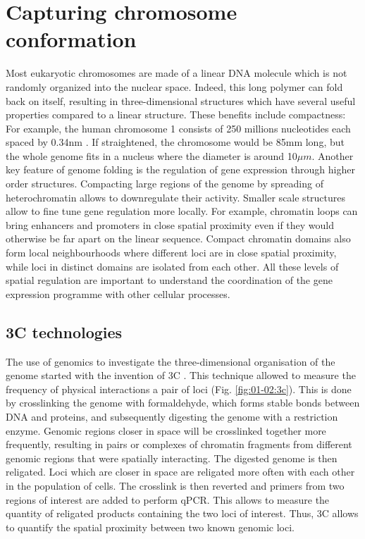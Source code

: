 \section{Capturing chromosome conformation}
Most eukaryotic chromosomes are made of a linear DNA molecule which is not randomly organized into the nuclear space. Indeed, this long polymer can fold back on itself, resulting in three-dimensional structures which have several useful properties compared to a linear structure. These benefits include compactness: For example, the human chromosome 1 consists of 250 millions nucleotides each spaced by 0.34nm \cite {langridgeMolecularConfigurationDeoxyribonucleic1960}. If straightened, the chromosome would be 85mm long, but the whole genome fits in a nucleus where the diameter is around 10$\mu m$. Another key feature of genome folding is the regulation of gene expression through higher order structures. Compacting large regions of the genome by spreading of \Gls{heterochromatin} allows to downregulate their activity. Smaller scale structures allow to fine tune gene regulation more locally. For example, \Gls{chromatin} loops can bring enhancers and promoters in close spatial proximity even if they would otherwise be far apart on the linear sequence. Compact chromatin domains also form local neighbourhoods where different loci are in close spatial proximity, while loci in distinct domains are isolated from each other. All these levels of spatial regulation are important to understand the coordination of the gene expression programme with other cellular processes.

\subsection{3C technologies}

The use of genomics to investigate the three-dimensional organisation of the genome started with the invention of \acrfull{3C} \cite{dekkerCapturingChromosomeConformation2002}. This technique allowed to measure the frequency of physical interactions a pair of loci (Fig. \ref{fig:01-02:3c}). This is done by crosslinking the genome with formaldehyde, which forms stable bonds between DNA and proteins, and subsequently digesting the genome with a restriction enzyme. Genomic regions closer in space will be crosslinked together more frequently, resulting in pairs or complexes of chromatin fragments from different genomic regions that were spatially interacting. The digested genome is then religated. Loci which are closer in space are religated more often with each other in the population of cells. The crosslink is then reverted and primers from two regions of interest are added to perform qPCR. This allows to measure the quantity of religated products containing the two loci of interest. Thus, 3C allows to quantify the spatial proximity between two known genomic loci.


